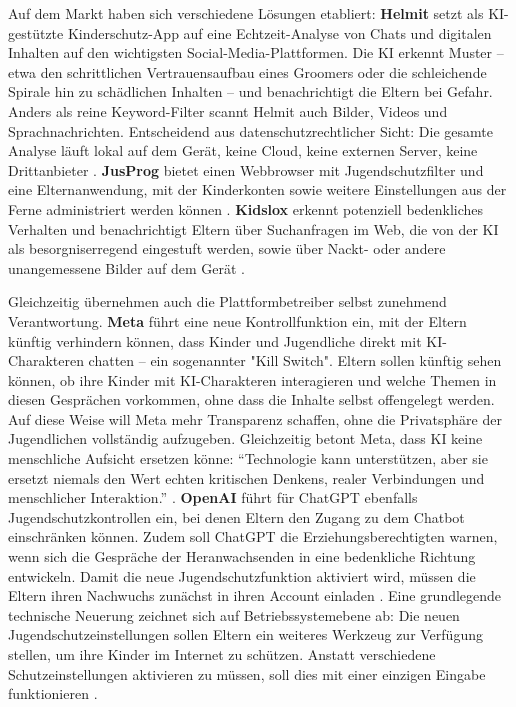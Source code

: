 \documentclass[12pt,a4paper]{article}
\begin{document}
	Auf dem Markt haben sich verschiedene Lösungen etabliert: \textbf{Helmit} setzt als KI-gestützte Kinderschutz-App auf eine Echtzeit-Analyse von Chats und digitalen Inhalten auf den wichtigsten Social-Media-Plattformen. Die KI erkennt Muster – etwa den schrittlichen Vertrauensaufbau eines Groomers oder die schleichende Spirale hin zu schädlichen Inhalten – und benachrichtigt die Eltern bei Gefahr. Anders als reine Keyword-Filter scannt Helmit auch Bilder, Videos und Sprachnachrichten. Entscheidend aus datenschutzrechtlicher Sicht: Die gesamte Analyse läuft lokal auf dem Gerät, keine Cloud, keine externen Server, keine Drittanbieter \cite{Helmit2025}. \textbf{JusProg} bietet einen Webbrowser mit Jugendschutzfilter und eine Elternanwendung, mit der Kinderkonten sowie weitere Einstellungen aus der Ferne administriert werden können \cite{JusProg2025}. \textbf{Kidslox} erkennt potenziell bedenkliches Verhalten und benachrichtigt Eltern über Suchanfragen im Web, die von der KI als besorgniserregend eingestuft werden, sowie über Nackt- oder andere unangemessene Bilder auf dem Gerät \cite{Kidslox2025}.
	
	Gleichzeitig übernehmen auch die Plattformbetreiber selbst zunehmend Verantwortung. \textbf{Meta} führt eine neue Kontrollfunktion ein, mit der Eltern künftig verhindern können, dass Kinder und Jugendliche direkt mit KI-Charakteren chatten – ein sogenannter "Kill Switch". Eltern sollen künftig sehen können, ob ihre Kinder mit KI-Charakteren interagieren und welche Themen in diesen Gesprächen vorkommen, ohne dass die Inhalte selbst offengelegt werden. Auf diese Weise will Meta mehr Transparenz schaffen, ohne die Privatsphäre der Jugendlichen vollständig aufzugeben. Gleichzeitig betont Meta, dass KI keine menschliche Aufsicht ersetzen könne: \enquote{Technologie kann unterstützen, aber sie ersetzt niemals den Wert echten kritischen Denkens, realer Verbindungen und menschlicher Interaktion.} \cite{Meta2025}. \textbf{OpenAI} führt für ChatGPT ebenfalls Jugendschutzkontrollen ein, bei denen Eltern den Zugang zu dem Chatbot einschränken können. Zudem soll ChatGPT die Erziehungsberechtigten warnen, wenn sich die Gespräche der Heranwachsenden in eine bedenkliche Richtung entwickeln. Damit die neue Jugendschutzfunktion aktiviert wird, müssen die Eltern ihren Nachwuchs zunächst in ihren Account einladen \cite{OpenAI2025}. Eine grundlegende technische Neuerung zeichnet sich auf Betriebssystemebene ab: Die neuen Jugendschutzeinstellungen sollen Eltern ein weiteres Werkzeug zur Verfügung stellen, um ihre Kinder im Internet zu schützen. Anstatt verschiedene Schutzeinstellungen aktivieren zu müssen, soll dies mit einer einzigen Eingabe funktionieren \cite{OS2025}.
	
\end{document}
